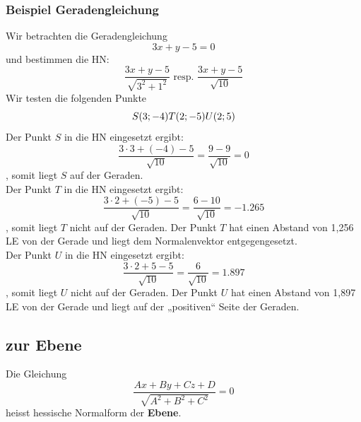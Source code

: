 \subsubsection{Beispiel Geradengleichung}
Wir betrachten die Geradengleichung \begin{displaymath} 3x + y - 5 = 0 \end{displaymath} und bestimmen die HN:
\begin{displaymath} \frac{3x+y-5}{\sqrt{3^{2} + 1^{2}}} \text{ resp. } \frac{3x+y-5}{\sqrt{10}} \end{displaymath}
Wir testen die folgenden Punkte \begin{displaymath}S(3;-4)\\T(2; -5)\\ U(2; 5) \end{displaymath}
Der Punkt \(S\) in die HN eingesetzt ergibt: \begin{displaymath} \frac{3\cdot3 + (-4) -5}{\sqrt{10}} = \frac{9-9}{\sqrt{10}} = 0 \end{displaymath}, somit liegt \(S\) auf der Geraden.\\
Der Punkt \(T\) in die HN eingesetzt ergibt: \begin{displaymath}\frac{3\cdot2 + (-5) -5}{\sqrt{10}} = \frac{6-10}{\sqrt{10}} = -1.265 \end{displaymath}, somit liegt \(T\) nicht auf der Geraden. Der Punkt \(T\) hat einen Abstand von 1,256 LE von der Gerade und liegt dem Normalenvektor entgegengesetzt. \\
Der Punkt \(U\) in die HN eingesetzt ergibt: \begin{displaymath} \frac{3\cdot2 +5-5}{\sqrt{10}} = \frac{6}{\sqrt{10}} = 1.897 \end{displaymath}, somit liegt \(U\) nicht auf der Geraden. Der Punkt \(U\) hat einen Abstand von 1,897 LE von der Gerade und liegt auf der „positiven“ Seite der Geraden.
\subsection{zur Ebene}
Die Gleichung \begin{displaymath} \frac{Ax + By + Cz + D}{\sqrt{A^{2} + B^{2} + C^{2}}} = 0 \end{displaymath} heisst hessische Normalform der \textbf{Ebene}.
